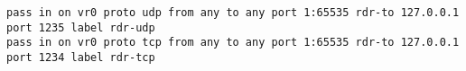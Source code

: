 
\begin{lstlisting}
pass in on vr0 proto udp from any to any port 1:65535 rdr-to 127.0.0.1 port 1235 label rdr-udp
pass in on vr0 proto tcp from any to any port 1:65535 rdr-to 127.0.0.1 port 1234 label rdr-tcp
\end{lstlisting}
